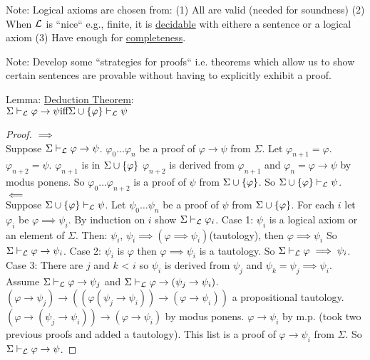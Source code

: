 \documentclass[11pt]{amsart}
\begin{document}
    Note: Logical axioms are chosen from:
    (1) All are valid (needed for soundness)
    (2) When $\mathcal{L}$ is ``nice`` e.g., finite, it is \underline{decidable} with eithere a sentence or a logical axiom
    (3) Have enough for \underline{completeness}.

    Note: Develop some ``strategies for proofs`` i.e. theorems which allow us to show certain sentences are provable without having to explicitly exhibit a proof.

    Lemma: \underline{Deduction Theorem}: \\
    $\Sigma \vdash_{\mathcal{L}} \varphi \rightarrow \psi \text{iff} \Sigma \cup \{\varphi\} \vdash_{\mathcal{L}} \psi$

    \begin{proof}
        $\implies$ \\
        Suppose $\Sigma \vdash_{\mathcal{L}} \varphi \rightarrow \psi$.
        $\varphi_0 \dots \varphi_n$ be a proof of $\varphi \rightarrow \psi$ from $\Sigma$.
        Let $\varphi_{n+1} = \varphi$.
        $\varphi_{n+2} = \psi$.
        $\varphi_{n+1}$ is in $\Sigma \cup \{\varphi\}$
        $\varphi_{n+2}$ is derived from $\varphi_{n+1}$ and $\varphi_n = \varphi \rightarrow \psi$ by modus ponens.
        So $\varphi_0 \dots \varphi_{n+2}$ is a proof of $\psi$ from $\Sigma \cup \{\varphi\}$.
        So $\Sigma \cup \{\varphi\} \vdash_{\mathcal{L}} \psi$.
        \\
        $\impliedby$ \\
        Suppose $\Sigma \cup \{\varphi\} \vdash_{\mathcal{L}} \psi$.
        Let $\psi_0 \dots \psi_n$ be a proof of $\psi$ from $\Sigma \cup \{\varphi\}$.
        For each $i$ let $\varphi_i$ be $\varphi \implies \psi_i$.
        By induction on $i$ show $\Sigma \vdash_{\mathcal{L}} \varphi_i$.
        Case 1: $\psi_i$ is a logical axiom or an element of $\Sigma$.
        Then: $\psi_i$, $\psi_i \implies (\varphi \implies \psi_i)$(tautology), then $\varphi \implies \psi_i$
        So $\Sigma \vdash_{\mathcal{L}} \varphi \rightarrow \psi_i$.
        Case 2: $\psi_i$ is $\varphi$ then $\varphi \implies \psi_i$ is a tautology.
        So $\Sigma \vdash_{\mathcal{L}} \varphi \implies \psi_i$.
        Case 3: There are $j$ and $k$ < $i$ so $\psi_i$ is derived from $\psi_j$ and $\psi_k = \psi_j \implies \psi_i$.
        Assume $\Sigma \vdash_{\mathcal{L}} \varphi \rightarrow \psi_j$ and $\Sigma \vdash_{\mathcal{L}} \varphi \rightarrow (\psi_j \rightarrow \psi_i)$.
        $(\varphi \rightarrow \psi_j) \rightarrow((\varphi(\psi_j \rightarrow \psi_i))\rightarrow(\varphi \rightarrow \psi_i))$ a propositional tautology.
        $(\varphi \rightarrow(\psi_j \rightarrow \psi_i)) \rightarrow (\varphi \rightarrow \psi_i)$ by modus ponens.
        $\varphi \rightarrow \psi_i$ by m.p. (took two previous proofs and added a tautology).
        This list is a proof of $\varphi \rightarrow \psi_i$ from $\Sigma$.
        So $\Sigma \vdash_{\mathcal{L}} \varphi \rightarrow \psi$.
    \end{proof}
\end{document}
